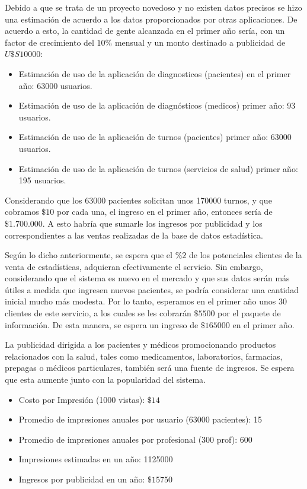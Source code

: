 \documentclass[a4paper,10pt]{article}
\begin{document}
Debido a que se trata de un proyecto novedoso y no existen datos precisos se hizo una estimación de acuerdo a los datos proporcionados por otras aplicaciones. De acuerdo a esto, la cantidad de gente alcanzada en el primer año sería, con  un factor de crecimiento del $10\%$ mensual y un monto destinado a publicidad de $U\$S 10000$:

\begin{itemize}  
\item Estimación de uso de la aplicación de diagnosticos (pacientes) en el primer año: 63000 usuarios.
\item Estimación de uso de la aplicación de diagnósticos (medicos) primer año: 93 usuarios.
\item Estimación de uso de la aplicación de turnos (pacientes) primer año: 63000 usuarios.
\item Estimación de uso de la aplicación de turnos (servicios de salud)  primer año: 195 usuarios. 
\end{itemize}

Considerando que los 63000 pacientes solicitan unos 170000 turnos, y que cobramos $\$ 10$ por cada una, el ingreso en el primer año, entonces sería de $\$ 1.700.000$. A esto habría que sumarle los ingresos por publicidad y los correspondientes a las ventas realizadas de la base de datos estadística.

Según lo dicho anteriormente, se espera que el $\%2$ de los potenciales clientes de la venta de estadísticas, adquieran efectivamente el servicio. Sin embargo, considerando que el sistema es nuevo en el mercado y que sus datos serán más útiles a medida que ingresen nuevos pacientes, se podría considerar una cantidad inicial mucho más modesta. Por lo tanto, esperamos en el primer año unos 30 clientes de este servicio, a los cuales se les cobrarán $\$5500$ por el paquete de información. De esta manera, se espera un ingreso de $\$165000$ en el primer año.

La publicidad dirigida a los pacientes y médicos promocionando productos relacionados con la salud, tales como medicamentos, laboratorios, farmacias, prepagas o médicos particulares, también será una fuente de ingresos. Se espera que esta aumente junto con la popularidad del sistema.

\begin{itemize}
\item Costo por Impresión (1000 vistas): $\$14$
\item Promedio de impresiones anuales por usuario (63000 pacientes): 15
\item Promedio de impresiones anuales por profesional (300 prof): 600
\item Impresiones estimadas en un año: 1125000 
\item Ingresos por publicidad en un año: $\$15750$
\end{itemize}
\end{document}
